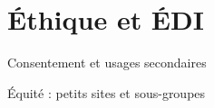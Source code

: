\section{Éthique et ÉDI}

\begin{frame}{Consentement et usages secondaires}
\end{frame}

\begin{frame}{Équité : petits sites et sous-groupes}
\end{frame}

